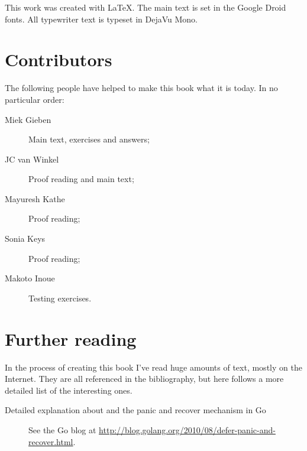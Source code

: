 \noindent{}This work was created with \LaTeX. The main text is set in
the Google Droid fonts. All typewriter text is typeset in DejaVu Mono.

\section{Contributors}
The following people have helped to make this book what it is today.
In no particular order:
\begin{description}
\item[Miek Gieben] 
{Main text, exercises and answers;}
\item[JC van Winkel]
{Proof reading and main text;}
\item[Mayuresh Kathe]
{Proof reading;}
\item[Sonia Keys]
{Proof reading;}
\item[Makoto Inoue]
{Testing exercises.}
\end{description}

\section{Further reading}
In the process of creating this book I've read huge amounts of text,
mostly on the Internet. They are all referenced in the bibliography, but
here follows a more detailed list of the interesting ones.
\begin{description}
\item[Detailed explanation about  and the panic and recover
mechanism in Go]{See the Go blog at
\url{http://blog.golang.org/2010/08/defer-panic-and-recover.html}.}
\end{description}
